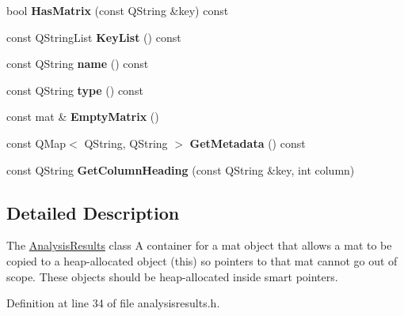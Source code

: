 \begin{DoxyCompactItemize}
\item 
bool {\bfseries Has\+Matrix} (const Q\+String \&key) const \hypertarget{class_analysis_results_a7ff410b4275328eb6c0c052457909501}{}\label{class_analysis_results_a7ff410b4275328eb6c0c052457909501}

\item 
const Q\+String\+List {\bfseries Key\+List} () const \hypertarget{class_analysis_results_a4f2a23b3461e50e96615e13fba5eab68}{}\label{class_analysis_results_a4f2a23b3461e50e96615e13fba5eab68}

\item 
const Q\+String {\bfseries name} () const \hypertarget{class_analysis_results_a62f30547afe13cf20869c6949457f68d}{}\label{class_analysis_results_a62f30547afe13cf20869c6949457f68d}

\item 
const Q\+String {\bfseries type} () const \hypertarget{class_analysis_results_a1211edd55e255b6a3571cb47a4a34809}{}\label{class_analysis_results_a1211edd55e255b6a3571cb47a4a34809}

\item 
const mat \& {\bfseries Empty\+Matrix} ()\hypertarget{class_analysis_results_a7e543ccde6636b915bd193bd4ebbe9a9}{}\label{class_analysis_results_a7e543ccde6636b915bd193bd4ebbe9a9}

\item 
const Q\+Map$<$ Q\+String, Q\+String $>$ {\bfseries Get\+Metadata} () const \hypertarget{class_analysis_results_abe9a8bf2d52dd04a09dd33004e6521ac}{}\label{class_analysis_results_abe9a8bf2d52dd04a09dd33004e6521ac}

\item 
const Q\+String {\bfseries Get\+Column\+Heading} (const Q\+String \&key, int column)\hypertarget{class_analysis_results_a6d306bc1abb09b1e41bcf0a3effc4bf6}{}\label{class_analysis_results_a6d306bc1abb09b1e41bcf0a3effc4bf6}

\end{DoxyCompactItemize}


\subsection{Detailed Description}
The \hyperlink{class_analysis_results}{Analysis\+Results} class A container for a mat object that allows a mat to be copied to a heap-\/allocated object (this) so pointers to that mat cannot go out of scope. These objects should be heap-\/allocated inside smart pointers. 

Definition at line 34 of file analysisresults.\+h.



